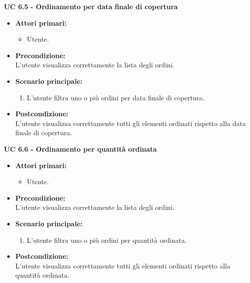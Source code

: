 \vspace{0.4cm}

\noindent \textbf{\large UC 6.5 - Ordinamento per data finale di copertura}
\label{uc:ordinamento-data-finale-copertura}
\begin{itemize}

	\item \textbf{Attori primari: }
		\begin{itemize}
			\item Utente.
		\end{itemize}

	\item \textbf{Precondizione: }\\[0.3cm]
		L'utente visualizza correttamente la lista degli ordini.

	\item \textbf{Scenario principale: }
		\begin{enumerate}
			\item L'utente filtra uno o più ordini per data finale di copertura.
		\end{enumerate}
		

	\item \textbf{Postcondizione: }\\[0.3cm]
		L'utente visualizza correttamente tutti gli elementi ordinati rispetto alla data finale di copertura.

\end{itemize}

\vspace{0.4cm}

\noindent \textbf{\large UC 6.6 - Ordinamento per quantità ordinata}
\label{uc:ordinamento-quantita-ordinata}
\begin{itemize}

	\item \textbf{Attori primari: }
		\begin{itemize}
			\item Utente.
		\end{itemize}

	\item \textbf{Precondizione: }\\[0.3cm]
		L'utente visualizza correttamente la lista degli ordini.

	\item \textbf{Scenario principale: }
		\begin{enumerate}
			\item L'utente filtra uno o più ordini per quantità ordinata.
		\end{enumerate}
		

	\item \textbf{Postcondizione: }\\[0.3cm]
		L'utente visualizza correttamente tutti gli elementi ordinati rispetto alla quantità ordinata.

\end{itemize}

